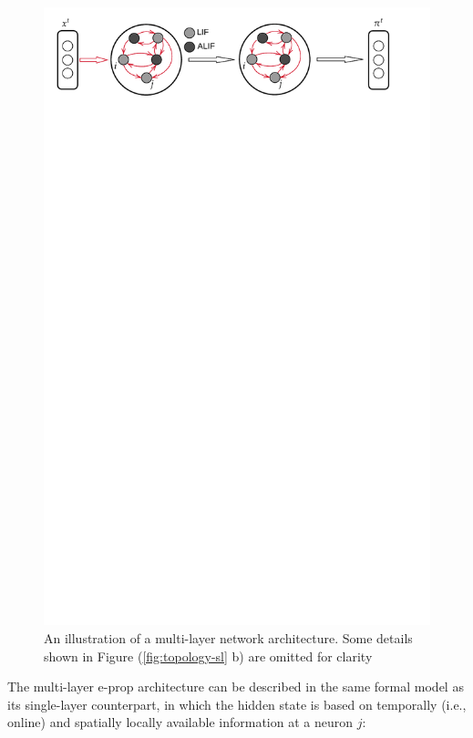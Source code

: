 		\begin{figure}[!ht]
		    \myfloatalign
		    \includegraphics[trim=0 25cm 0 0, clip, width=\linewidth]{gfx/Multilayer}
		    \caption[Multi-layer illustration.]{An illustration of a multi-layer network architecture. Some details shown in Figure (\ref{fig:topology-sl} b) are omitted for clarity}
		    \label{fig:topology-ml}
		  \end{figure}

		The multi-layer e-prop architecture can be described in the same formal model as its single-layer counterpart, in which the hidden state is based on temporally (i.e., online) and spatially locally available information at a neuron $j$:

